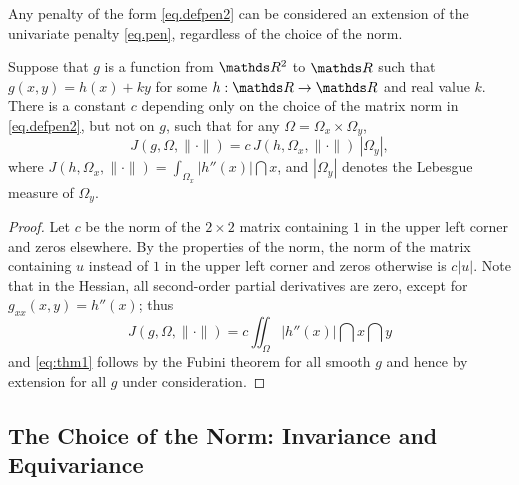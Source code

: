 Any penalty of the form \eqref{eq.defpen2} can be considered an
extension of the univariate penalty \eqref{eq.pen}, regardless of the
choice of the norm.
\begin{thm}
\label{thm1}
Suppose that $g$ is a function from $\RR^2$ to $\RR$ such that
$g(x,y) = h(x) + ky$ for some $h:\RR \rightarrow \RR$ and real value $k$.
There is a constant $c$ depending only
on the choice of the matrix norm in \eqref{eq.defpen2}, but not on $g$,
such that for any $\varOmega = \varOmega_x \times \varOmega_y$,
\begin{equation}
\label{eq:thm1}
J(g,\varOmega, \| \cdot \|) = c\, J(h,\varOmega_x, \| \cdot \|) \
|\varOmega_y|,\end{equation}
where
$J(h,\varOmega_x, \| \cdot \|) = \int_{\Omega_x} |h'' (x) | \dint x$, and
$|\varOmega_y|$ denotes the Lebesgue measure of $\varOmega_y$.
\end{thm}
\begin{proof}
Let $c$ be the norm of the $2 \times 2$ matrix containing $1$ in the upper
left corner and zeros elsewhere. By the properties of the
norm, the norm of the matrix containing $u$ instead of $1$ in the
upper left corner and zeros otherwise is $c |u|$. Note that in the
Hessian, all second-order partial derivatives are zero, except for
$g_{xx} (x,y)= h''(x)$; thus
\begin{equation*}
J(g,\varOmega, \| \cdot \|) = c \iint_{\varOmega}  | h''(x) | \dint x \dint y
\end{equation*}
and \eqref{eq:thm1} follows by the Fubini theorem for all smooth $g$
and hence by extension for all $g$ under consideration.
\end{proof}


 
\subsection{The Choice of the Norm: Invariance and Equivariance}
 
